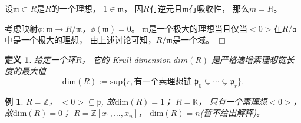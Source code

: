 \documentclass[12pt,a4paper]{ctexbook} %
\newcounter{theorem}[section]
\newtheorem{definition}[theorem]{定义}
\newtheorem{example}[theorem]{例}
\numberwithin{figure}{section}
\theoremstyle{problemstyle}
\renewenvironment{proof}[1][证明]{\par\noindent{\kaishu\textbf{#1.} }\normalfont\fontspec{STFangsong}}{\hfill\ensuremath{\Box}\par}
\renewenvironment{proof}[1][证明]{\par\noindent{\kaishu\textbf{#1.} }\normalfont\CJKfamily{zhfs}}{\hfill\ensuremath{\Box}\par}
\numberwithin{equation}{section} %
\begin{document}
     \begin{proof}
     设$ \mathfrak{m}\subset R $是$ R $的一个理想， $ 1\in \mathfrak{m} $， 因$ R $有逆元且$ \mathfrak{m} $有吸收性， 那么$ m=R $。
     
     考虑映射$ \phi:\mathfrak{m} \rightarrow R/ \mathfrak{m} $，$ \phi(\mathfrak{m})=0 $。 $ \mathfrak{m} $是一个极大的理想当且仅当$ <0> $在$ R/ \mathfrak{a} $中是一个极大的理想， 由上述讨论可知，$ R/ \mathfrak{m} $是一个域。
     \end{proof}
     \begin{definition}
     	给定一个环$ R $， 它的
     	     Krull dimension $ dim(R) $ 是严格递增素理想链长度的最大值
     	     \[ \text{dim}(R):=\text{sup}\{r, \text{有一个素理想链 }\mathfrak{p}_{0}\subsetneq \cdots\subsetneq\mathfrak{p}_{r}\}. \]
     \end{definition}
     \begin{example}
$      	R=\mathbb{Z} $， $ <0>\subsetneq\mathfrak{p} $, 故$\text{dim}(R)=1$；
$      	R=\mathbb{K} $， 只有一个素理想$ <0> $， 故$\text{dim}(R)=0$；
$      	R=\mathbb{Z}[x_{1},\ldots,x_{n}] $， $\text{dim}(R)=n$(暂不给出解释)。
     \end{example}
 
\end{document}
